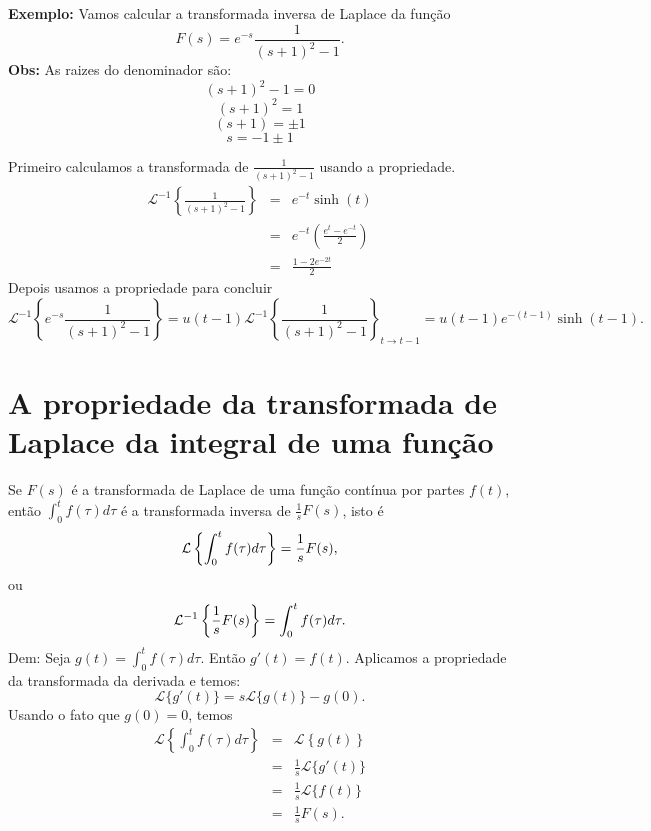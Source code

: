 \documentclass[a4paper,10pt]{book}
\begin{document}
%  
%   
   {\bf Exemplo:}
   Vamos calcular a transformada inversa de Laplace da função
  \begin{equation}
  F(s)=e^{-s}\frac{1}{(s+1)^2-1}.
  \end{equation}
{\bf Obs:} As raizes do denominador são:
$$(s+1)^2-1=0$$
  $$(s+1)^2=1$$
  $$(s+1) = \pm 1$$
  $$s = -1\pm 1$$
  
    Primeiro calculamos a transformada de $\frac{1}{(s+1)^2-1}$ usando a propriedade.
   \begin{eqnarray*}
   \mathcal{L}^{-1}\left\{\frac{1}{(s+1)^2-1}\right\}&=&e^{-t}\sinh(t)\\
   &=&e^{-t}\left(\frac{e^{t}-e^{-t}}{2}\right)\\
   &=&\frac{1-2e^{-2t}}{2}
 \end{eqnarray*}
  Depois usamos a propriedade  para concluir
  \begin{equation}
  \mathcal{L}^{-1}\left\{e^{-s}\frac{1}{(s+1)^2-1}\right\}=u(t-1)\mathcal{L}^{-1}\left\{\frac{1}{(s+1)^2-1}\right\}
  _{t\to t-1}=u(t-1)e^{-(t-1)}\sinh(t-1).
   \end{equation}
%   
%   
%   
 \section{A propriedade da transformada de Laplace da integral de uma função}
  Se $F(s)$ é a transformada de Laplace de uma função contínua por partes $f(t)$, então $\int_0^tf(\tau)d\tau$ é a transformada inversa de $\frac{1}{s}F(s)$, isto é
 \begin{equation}{\label{eq_trans_int}}
 \mathcal{L}\left\{\int_0^tf(\tau)d\tau\right\} =\frac{1}{s}F(s),
 \end{equation}
 ou
 \begin{equation}{\label{eq_trans_int_inv}}
 \mathcal{L}^{-1} \left\{\frac{1}{s}F(s)\right\} =\int_0^tf(\tau)d\tau.
 \end{equation} 
% 
Dem: Seja $g(t)=\int_0^tf(\tau)d\tau$. Então $g'(t)=f(t)$. Aplicamos a propriedade da transformada da derivada  e temos:
 \begin{equation}
 \mathcal{L}\{g'(t)\}=s\mathcal{L}\{g(t)\}-g(0).
 \end{equation}
 Usando o fato que $g(0)=0$, temos
 \begin{eqnarray*}
 \mathcal{L}\left\{\int_0^tf(\tau)d\tau\right\}&=&\mathcal{L}\left\{g(t)\right\}\\
 &=&\frac{1}{s}\mathcal{L}\{g'(t)\}\\
 &=&\frac{1}{s}\mathcal{L}\{f(t)\}\\
 &=&\frac{1}{s}F(s).
 \end{eqnarray*}
% 
% 
  
\end{document}
